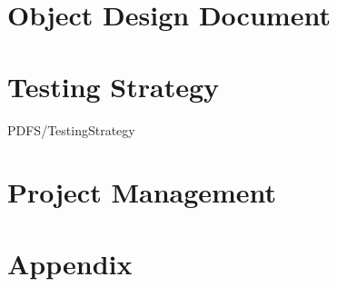 \documentclass{article}
\begin{document}
\section{Object Design Document}
	
\section{Testing Strategy}
	 {PDFS/TestingStrategy}
\section{Project Management}
	

	\section{Appendix}
\end{document}
